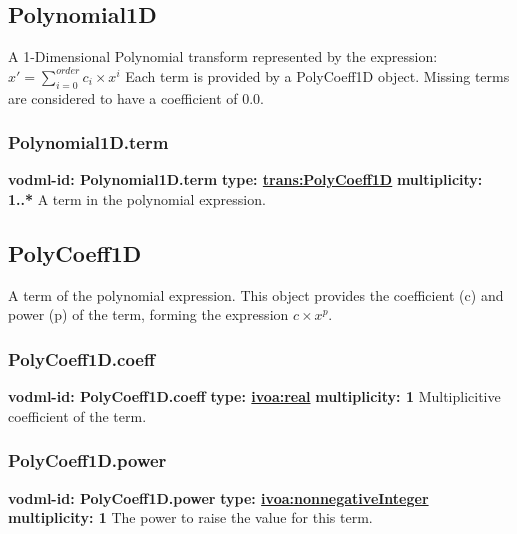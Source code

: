   \subsection{Polynomial1D}
  \label{sect:Polynomial1D}
    A 1-Dimensional Polynomial transform represented by the expression:
    \indent $x' = \sum_{i=0}^{order} c_i\times x^{i} $ \newline
    Each term is provided by a PolyCoeff1D object. Missing terms are considered to have a coefficient of 0.0.

    \subsubsection{Polynomial1D.term}
      \textbf{vodml-id: Polynomial1D.term} \newline
      \textbf{type: \hyperref[sect:PolyCoeff1D]{trans:PolyCoeff1D}} \newline
      \textbf{multiplicity: 1..*} \newline 
      A term in the polynomial expression.

  \subsection{PolyCoeff1D}
  \label{sect:PolyCoeff1D}
    A term of the polynomial expression. This object provides the coefficient (c) and power (p) of the term, forming the expression $c \times x^{p}$.

    \subsubsection{PolyCoeff1D.coeff}
      \textbf{vodml-id: PolyCoeff1D.coeff} \newline
      \textbf{type: \hyperref[sect:ivoa]{ivoa:real}} \newline
      \textbf{multiplicity: 1} \newline 
      Multiplicitive coefficient of the term.

    \subsubsection{PolyCoeff1D.power}
      \textbf{vodml-id: PolyCoeff1D.power} \newline
      \textbf{type: \hyperref[sect:ivoa]{ivoa:nonnegativeInteger}} \newline
      \textbf{multiplicity: 1} \newline 
      The power to raise the value for this term.

